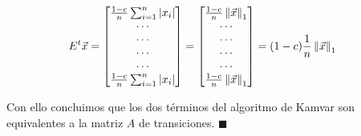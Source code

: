 \begin{align*}
E^{t}\vec{x} &= 
\begin{bmatrix}
\frac{1-c}{n} \sum_{i=1}^{n} |x_{i}|  \\
\cdots  \\
\cdots  \\
\cdots  \\
\cdots  \\
\frac{1-c}{n} \sum_{i=1}^{n} |x_{i}|  \\
\end{bmatrix}
=
\begin{bmatrix}
\frac{1-c}{n} \left\|\vec{x}\right\|_1 \\
\cdots  \\
\cdots  \\
\cdots  \\
\cdots  \\
\frac{1-c}{n} \left\|\vec{x}\right\|_1 \\
\end{bmatrix}
=
(1-c)\frac{1}{n} \left\|\vec{x}\right\|_1
\end{align*}

Con ello concluimos que los dos términos del algoritmo de Kamvar son equivalentes
a la matriz $A$ de transiciones. $ \blacksquare $

